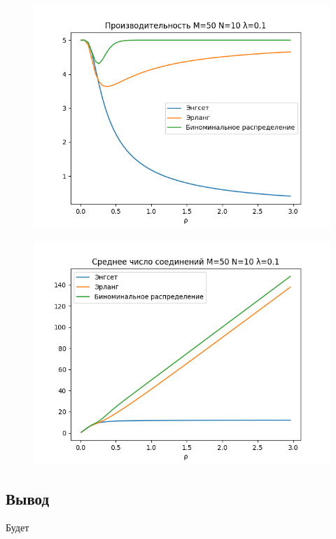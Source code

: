 \documentclass[12pt]{article}
\let\Oldsubsection\subsection
\renewcommand{\subsection}{\FloatBarrier\Oldsubsection}
\begin{document}
\begin{figure}[!htb]
\centering
\includegraphics[scale=1.00]{assets/iss_3/perf_M50_N10_lam01.png}
\caption{}
\label{}
\end{figure}

\begin{figure}[!htb]
\centering
\includegraphics[scale=1.00]{assets/iss_3/aver_conn_M50_N10_lam01.png}
\caption{}
\label{}
\end{figure}

\subsection{Вывод}
Будет
\end{document}
